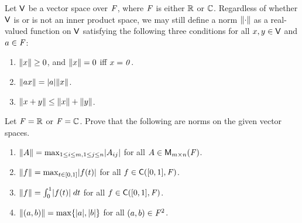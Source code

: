 \begin{defn}\label{6.1.14}
  Let \(\mathsf{V}\) be a vector space over \(\mathit{F}\), where \(\mathit{F}\) is either \(\mathbb{R}\) or \(\mathbb{C}\).
  Regardless of whether \(\mathsf{V}\) is or is not an inner product space, we may still define a norm \(\left\lVert\cdot\right\rVert\) as a real-valued function on \(\mathsf{V}\) satisfying the following three conditions for all \(x, y \in \mathsf{V}\) and \(a \in \mathit{F}\):
  \begin{enumerate}
    \item \(\left\lVert x\right\rVert \geq 0\), and \(\left\lVert x\right\rVert = 0\) iff \(x = \mathit{0}\).
    \item \(\norm{ax} = \abs{a} \norm{x}\).
    \item \(\left\lVert x + y\right\rVert \leq \left\lVert x\right\rVert + \left\lVert y\right\rVert\).
  \end{enumerate}
\end{defn}

\begin{ex}\label{ex:6.1.24}
  Let \(\mathit{F} = \mathbb{R}\) or \(\mathit{F} = \mathbb{C}\).
  Prove that the following are norms on the given vector spaces.
  \begin{enumerate}
    \item \(\norm{A} = \max_{1 \leq i \leq m, 1 \leq j \leq n} \abs{A_{i j}}\) for all \(A \in \ms\).
    \item \(\norm{f} = \max_{t \in [0, 1]} \abs{f(t)}\) for all \(f \in \cfs([0, 1], \F)\).
    \item \(\norm{f} = \int_0^1 \abs{f(t)} \; dt\) for all \(f \in \cfs([0, 1], \F)\).
    \item \(\norm{(a, b)} = \max\set{\abs{a}, \abs{b}}\) for all \((a, b) \in \mathit{F}^2\).
  \end{enumerate}
\end{ex}

